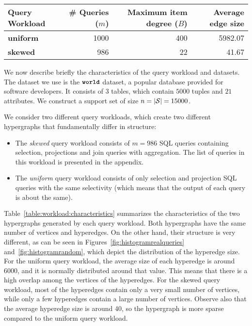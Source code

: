 \begin{table*}[] \centering
	\begin{small}
		\begin{tabular}{@{}lrrr@{}}\toprule
			\textbf{Query Workload} & \textbf{\# Queries ($m$)} & \textbf{Maximum item degree ($B$)} & \textbf{Average edge size} \\ \midrule
			\textbf{uniform} &  1000 & 400 & 5982.07   \\ \hdashline
			\textbf{skewed} &  986 & 22 & 41.67    \\ 
			
			\bottomrule
		\end{tabular}
	\end{small}
	\caption{Hypergraph Characteristics}
	\label{table:workload:characteristics}
\end{table*}

We now describe briefly the characteristics of the query workload and datasets. The dataset we use is the $\texttt{\bfseries world}$ dataset, a popular database provided for software developers. 
It consists of $3$ tables, which contain $5000$ tuples and $21$ attributes. We construct a support set of size $n = |\mathcal{S}| = 15000$.

We consider two different query workloads, which create two different hypergraphs that fundamentally differ in structure:
%
\begin{itemize}
\item The {\em skewed} query workload consists of $m = 986$ SQL queries containing selection, projections and join queries with aggregation. The list of queries in this workload is presented in the appendix. 
%
\item The {\em uniform} query workload consists of only selection and projection SQL queries with the same selectivity (which means that the output of each query is about the same). 
\end{itemize}

Table~\ref{table:workload:characteristics} summarizes the characteristics of the two hypergraphs
generated by each query workload. Both hypergraphs have the same number of vertices and
hyperedges. On the other hand, their structure is very different, as can be seen in 
Figures~\ref{fig:histogramrealqueries} and~\ref{fig:histogramrandom}, which depict the distribution of the hyperedge size. For the uniform query workload, the average size of each hyperedge is around 6000, and it is normally distributed around that value. This means that there is a high overlap among the vertices of the hyperedges. For the skewed query workload, most of the hyperedges contain only a very small number of vertices, while only a few hyperedges contain a large number of vertices. Observe also that the average hyperedge size is around 40, so the hypergraph is more sparse
compared to the uniform query workload.


